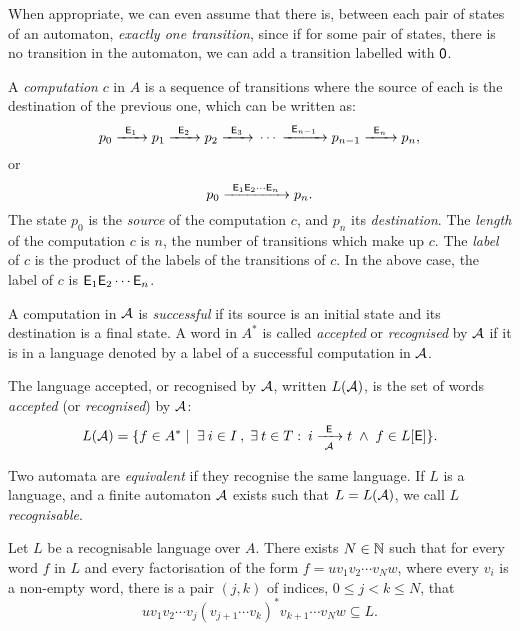 When appropriate, we can even assume that there is, between each pair of states of an automaton, \emph{exactly one transition}, since if for some pair of states, there is no transition in the automaton, we can add a transition labelled with ${\mathsf{0}}$.

A \emph{computation} $c$ in $A$ is a sequence of transitions where the source of each is the destination of the previous one, which can be written as:
\[
    p_0 {\; \xrightarrow[]{\: \; {\mathsf{E}}_1 \: \;} \;} p_1 {\; \xrightarrow[]{\: \; {\mathsf{E}}_2 \: \;} \;} p_2 {\; \xrightarrow[]{\: \; {\mathsf{E}}_3 \: \;} \;} \dotsm {\; \xrightarrow[]{\: \; {\mathsf{E}}_{n-1} \: \;} \;} p_{n-1} {\; \xrightarrow[]{\: \; {\mathsf{E}}_n \: \;} \;} p_n,
\]
or
\[
    p_0 {\; \xrightarrow[]{\: \; {\mathsf{E}}_1 {\mathsf{E}}_2 \dotsm {\mathsf{E}}_n \: \;} \;} p_n.
\]
The state $p_0$ is the \emph{source} of the computation $c$, and $p_n$ its \emph{destination}. The \emph{length} of the computation $c$ is $n$, the number of transitions which make up $c$. The \emph{label} of $c$ is the product of the labels of the transitions of $c$. In the above case, the label of $c$ is ${\mathsf{E}}_1 {\mathsf{E}}_2 \dotsm {\mathsf{E}}_n$.

A computation in ${\mathcal{A}}$ is \emph{successful} if its source is an initial state and its destination is a final state. A word in $A^*$ is called \emph{accepted} or \emph{recognised} by ${\mathcal{A}}$ if it is in a language denoted by a label of a successful computation in ${\mathcal{A}}$.

\begin{defn}
    The language accepted, or recognised by ${\mathcal{A}}$, written $L({\mathcal{A}})$, is the set of words \emph{accepted} (or \emph{recognised}) by ${\mathcal{A}}$:
    \[
        L({\mathcal{A}}) = \{ f \in A^* \mid \; \exists \: i \in I \: , \; \exists \: t \in T : \: i {\; \xrightarrow[{\mathcal{A}}]{\: \; {\mathsf{E}} \: \;} \;} t \; \wedge \; f \in L[{\mathsf{E}}] \}.
    \]
\end{defn}

Two automata are \emph{equivalent} if they recognise the same language. If $L$ is a language, and a finite automaton ${\mathcal{A}}$ exists such that $L = L({\mathcal{A}})$, we call $L$ \emph{recognisable}.

\begin{lemma}\label{lm:block_star_lemma}
    Let $L$ be a recognisable language over $A$. There exists $N \in \mathbb{N}$ such that for every word $f$ in $L$ and every factorisation of the form $f = u v_1 v_2 \dotsm v_N w$, where every $v_i$ is a non-empty word, there is a pair $(j,k)$ of indices, $0 \leq j < k \leq N$, that
    \[
        u v_1 v_2 \dotsm v_j {(v_{j+1} \dotsm v_k)}^* v_{k+1} \dotsm v_N w \subseteq L.
    \]
\end{lemma}

